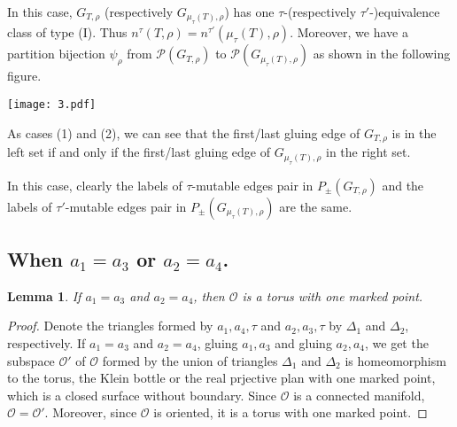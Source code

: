 \documentclass[10pt]{amsart}
\theoremstyle{theorems}
\newtheorem{Lemma}[Theorem]{Lemma}
\begin{document}
{}

In this case, $G_{T,\rho}$ (respectively $G_{\mu_{\tau}(T),\rho}$) has one $\tau$-(respectively $\tau'$-)equivalence class of type (I). Thus $n^{\tau}(T,\rho)=n^{\tau'}(\mu_{\tau}(T),\rho)$. Moreover, we have a partition bijection $\psi_{\rho}$ from $\mathcal P(G_{T,\rho})$ to $\mathcal P(G_{\mu_{\tau}(T),\rho})$ as shown in the following figure.

\centerline{\texttt{[image: 3.pdf]}}

As cases (1) and (2), we can see that the first/last gluing edge of $G_{T,\rho}$ is in the left set if and only if the first/last gluing edge of $G_{\mu_{\tau}(T),\rho}$ in the right set.

\medskip

In this case, clearly the labels of $\tau$-mutable edges pair in $P_{\pm}(G_{T,\rho})$ and the labels of $\tau'$-mutable edges pair in $P_{\pm}(G_{\mu_{\tau}(T),\rho})$ are the same.

\subsection{When $a_1= a_3$ or $a_2= a_4$.}

\begin{Lemma}

If $a_1=a_3$ and $a_2=a_4$, then $\mathcal O$ is a torus with one marked point.

\end{Lemma}

\begin{proof}

Denote the triangles formed by $a_1,a_4,\tau$ and $a_2,a_3,\tau$ by $\Delta_1$ and $\Delta_2$, respectively. If $a_1=a_3$ and $a_2=a_4$, gluing $a_1,a_3$ and gluing $a_2,a_4$, we get the subspace $\mathcal O'$ of $\mathcal O$ formed by the union of triangles $\Delta_1$ and $\Delta_2$ is homeomorphism to the torus, the Klein bottle or the real prjective plan with one marked point, which is a closed surface without boundary. Since $\mathcal O$ is a connected manifold, $\mathcal O=\mathcal O'$. Moreover, since $\mathcal O$ is oriented, it is a torus with one marked point.
\end{proof}
\end{document}
